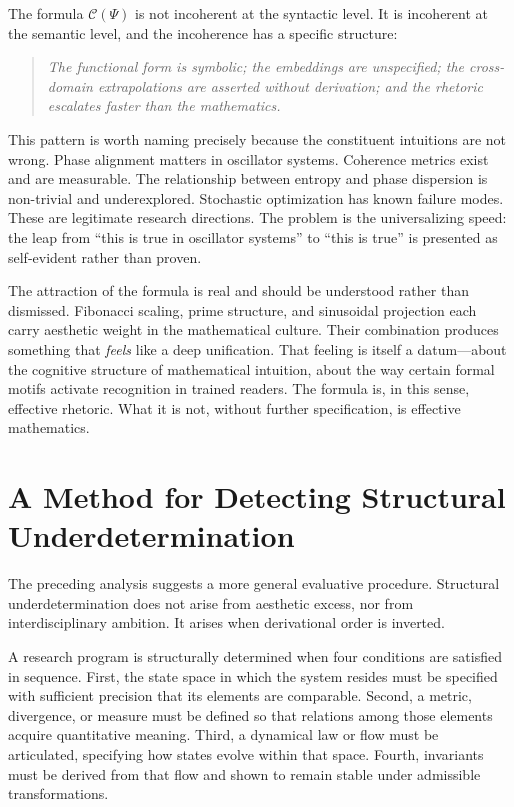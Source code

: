 \documentclass[12pt]{article}
\begin{document}
The formula $\mathcal{C}(\Psi)$ is not incoherent at the syntactic level. It is incoherent at the semantic level, and the incoherence has a specific structure:

\begin{quote}
\emph{The functional form is symbolic; the embeddings are unspecified; the cross-domain extrapolations are asserted without derivation; and the rhetoric escalates faster than the mathematics.}
\end{quote}

This pattern is worth naming precisely because the constituent intuitions are not wrong. Phase alignment matters in oscillator systems. Coherence metrics exist and are measurable. The relationship between entropy and phase dispersion is non-trivial and underexplored. Stochastic optimization has known failure modes. These are legitimate research directions. The problem is the universalizing speed: the leap from ``this is true in oscillator systems'' to ``this is true'' is presented as self-evident rather than proven.

The attraction of the formula is real and should be understood rather than dismissed. Fibonacci scaling, prime structure, and sinusoidal projection each carry aesthetic weight in the mathematical culture. Their combination produces something that \emph{feels} like a deep unification. That feeling is itself a datum---about the cognitive structure of mathematical intuition, about the way certain formal motifs activate recognition in trained readers. The formula is, in this sense, effective rhetoric. What it is not, without further specification, is effective mathematics.

\section{A Method for Detecting Structural Underdetermination}

The preceding analysis suggests a more general evaluative procedure. Structural underdetermination does not arise from aesthetic excess, nor from interdisciplinary ambition. It arises when derivational order is inverted.

A research program is structurally determined when four conditions are satisfied in sequence. First, the state space in which the system resides must be specified with sufficient precision that its elements are comparable. Second, a metric, divergence, or measure must be defined so that relations among those elements acquire quantitative meaning. Third, a dynamical law or flow must be articulated, specifying how states evolve within that space. Fourth, invariants must be derived from that flow and shown to remain stable under admissible transformations.
\end{document}
